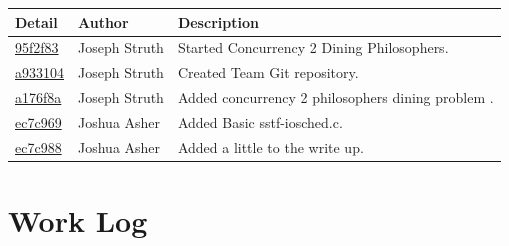\documentclass[10pt,draftclsnofoot,onecolumn, compsoc]{IEEEtran}
\begin{document}
\begin{tabular}{| l | l | p{15cm} |}\textbf{Detail} & \textbf{Author} & \textbf{Description}\\\hline
\href{https://github.com/struthj/CS444/commit/95f2f83c730dfb35f0292b3a825747fdde110c49}{95f2f83} & Joseph Struth & Started Concurrency 2 Dining Philosophers.\\\hline
\href{https://github.com/struthj/CS444-1303/commit/a933104c6c986f873737877b29bcf222933f805d}{a933104} & Joseph Struth & Created Team Git repository.\\\hline
\href{https://github.com/struthj/CS444-1303/commit/a176f8a30f2adef093bb56e16eb97c264fc956ec}{a176f8a} & Joseph Struth & Added concurrency 2 philosophers dining problem .\\\hline
\href{https://github.com/struthj/CS444-1303/commit/ec7c9692fc67d925772e42ce9317378f85fdb296}{ec7c969} & Joshua Asher & Added Basic sstf-iosched.c.\\\hline
\href{https://github.com/struthj/CS444-1303/commit/ec7c9692fc67d928f85fdb2965772e42ce931737}{ec7c988} & Joshua Asher & Added a little to the write up.\\\hline
\end{tabular}

\section{Work Log}
\end{document}
